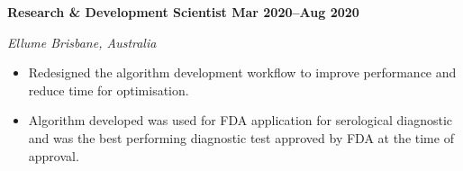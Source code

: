 \textbf{Research \& Development Scientist \hfill Mar 2020--Aug 2020}\par
\textit{Ellume \hfill Brisbane, Australia}\par
\begin{itemize}
	\item Redesigned the algorithm development workflow to improve performance and reduce time for optimisation.
    \item Algorithm developed was used for FDA application for serological diagnostic and was the best performing diagnostic test approved by FDA at the time of approval.
\end{itemize}\par